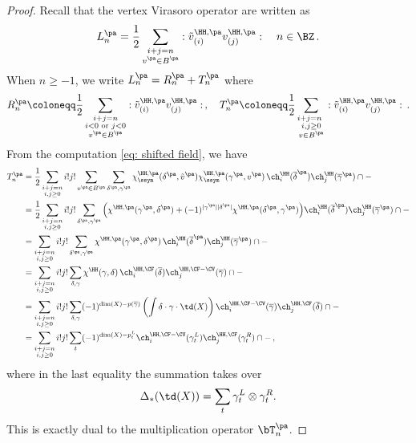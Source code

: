 \begin{proof}
Recall that the vertex Virasoro operator are written as
$$L_n^{\pa}=\frac{1}{2}\sum_{\substack{ i+j=n \\ v^{\pa}\in B^{\pa}}}:\tilde{v}^{\HH,\pa}_{(i)} v^{\HH,\pa}_{(j)}:\quad n\in\BZ\,.
$$
When $n\geq -1$, we write $L_n^{\pa}=R_n^{\pa}+T_n^{\pa}$ where
$$R_n^{\pa}\coloneqq \frac{1}{2}\sum_{\substack{ i+j=n\\ i<0\textnormal{ or }j<0 \\ v^{\pa}\in B^{\pa}}}:\tilde{v}^{\HH,\pa}_{(i)} v^{\HH,\pa}_{(j)}:\,,\quad
T_n^{\pa}\coloneqq \frac{1}{2}\sum_{\substack{ i+j=n\ \\i,j\geq 0 \\ v\in B^{\pa}}}:\tilde{v}^{\HH,\pa}_{(i)} v^{\HH,\pa}_{(j)}:\,.
$$
From the computation \eqref{eq: shifted field}, we have
\begin{align*}
    T_n^{\pa}
    &=\frac{1}{2}\sum_{\substack{i+j=n\\i,j\geq 0}}i!j!\sum_{v^{\pa}\in B^{\pa}}\sum_{\delta^{\pa}, \gamma^{\pa}}
    \chi^{\HH,\pa}_{\ssym}(\delta^{\pa},\tilde{v}^{\pa})
    \chi^{\HH,\pa}_{\ssym}(\gamma^{\pa},v^{\pa})\,
    \ch_i^\HH(\overline{\delta}^{\pa})\ch_j^\HH(\overline{\gamma}^{\pa})\cap -\\
    &=\frac{1}{2}\sum_{\substack{i+j=n\\i,j\geq 0}}i!j!
    \sum_{\delta^{\pa}, \gamma^{\pa}}
    \Big(\chi^{\HH,\pa}(\gamma^{\pa},\delta^{\pa})+(-1)^{|\gamma^{\pa}||\delta^{\pa}|}\chi^{\HH,\pa}(\delta^{\pa},\gamma^{\pa})\Big)
    \ch_i^\HH(\overline{\delta}^{\pa})\ch_j^\HH(\overline{\gamma}^{\pa})\cap -\\
    &=\sum_{\substack{i+j=n\\i,j\geq 0}}i!j!
    \sum_{\delta^{\pa}, \gamma^{\pa}}
    \chi^{\HH,\pa}(\gamma^{\pa},\delta^{\pa})\,
    \ch_i^\HH(\overline{\delta}^{\pa})\ch_j^\HH(\overline{\gamma}^{\pa})\cap -\\
    &=\sum_{\substack{i+j=n\\i,j\geq 0}}i!j!
   \sum_{\delta,\gamma}
    \chi^{\HH}(\gamma,\delta)\,
    \ch_i^{\HH,\CF}(\overline{\delta})\ch_j^{\HH,\CF-\CV}(\overline{\gamma})\cap -\\
    &=\sum_{\substack{i+j=n\\i,j\geq 0}}i!j!
   \sum_{\delta,\gamma}
   (-1)^{\dim(X)-p(\overline{\gamma})}
    \left(\int \delta \cdot \gamma\cdot \td(X)\right) \ch_i^{\HH,\CF-\CV}(\overline{\gamma})\ch_j^{\HH,\CF}(\overline{\delta})\cap -\\
    &=\sum_{\substack{i+j=n\\i,j\geq 0}}i!j!\sum_t (-1)^{\dim(X)-p_t^L}\ch_i^{\HH,\CF-\CV}(\gamma_t^L)\ch_j^{\HH,\CF}(\gamma_t^R)\cap -\,,
\end{align*}
where in the last equality the summation takes over
$$\Delta_*(\td(X))=\sum_t \gamma_t^L\otimes \gamma_t^R.
$$
This is exactly dual to the multiplication operator $\bT_n^{\pa}$.


\end{proof}
